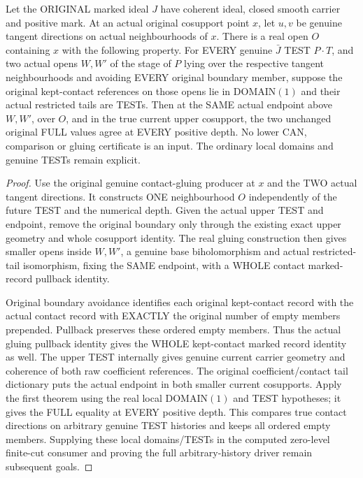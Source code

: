 \begin{theorem}
\label{hir:original-curve-noncanonical-contact-direction-full-values}
\leanok
Let the ORIGINAL marked ideal $J$ have coherent ideal, closed smooth carrier
and positive mark. At an actual original cosupport point $x$, let $u,v$ be
genuine tangent directions on actual neighbourhoods of $x$. There is a
real open $O$ containing $x$ with the following property. For EVERY genuine
$\bar J$ TEST $P\mathbin{\cdot}T$, and two actual opens $W,W'$ of the stage
of $P$ lying over the respective tangent neighbourhoods and avoiding EVERY
original boundary member, suppose the original kept-contact references on
those opens lie in DOMAIN$(1)$ and their actual restricted tails are TESTs.
Then at the SAME actual endpoint above $W,W'$, over $O$, and in the true
current upper cosupport, the two unchanged original FULL values agree at
EVERY positive depth. No lower CAN, comparison or gluing certificate is an
input. The ordinary local domains and genuine TESTs remain explicit.
\end{theorem}
\begin{proof}
Use the original genuine contact-gluing producer at $x$ and the TWO actual
tangent directions. It constructs ONE neighbourhood $O$ independently of
the future TEST and the numerical depth. Given the actual upper TEST and
endpoint, remove the original boundary only through the existing exact
upper geometry and whole cosupport identity. The real gluing construction
then gives smaller opens inside $W,W'$, a genuine base biholomorphism and
actual restricted-tail isomorphism, fixing the SAME endpoint, with a WHOLE
contact marked-record pullback identity.

Original boundary avoidance identifies each original kept-contact record
with the actual contact record with EXACTLY the original number of empty
members prepended. Pullback preserves these ordered empty members. Thus
the actual gluing pullback identity gives the WHOLE kept-contact marked
record identity as well. The upper TEST internally gives genuine current
carrier geometry and coherence of both raw coefficient references. The
original coefficient/contact tail dictionary puts the actual endpoint in
both smaller current cosupports. Apply the first theorem using the real
local DOMAIN$(1)$ and TEST hypotheses; it gives the FULL equality at EVERY
positive depth. This compares true contact directions on arbitrary genuine
TEST histories and keeps all ordered empty members. Supplying these local
domains/TESTs in the computed zero-level finite-cut consumer and proving the
full arbitrary-history driver remain subsequent goals.
\end{proof}
